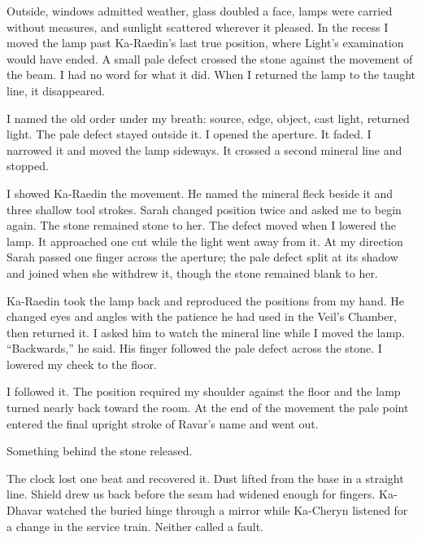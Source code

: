 Outside, windows admitted weather, glass doubled a face, lamps were carried without measures, and sunlight scattered wherever it pleased. In the recess I moved the lamp past Ka-Raedin's last true position, where Light's examination would have ended. A small pale defect crossed the stone against the movement of the beam. I had no word for what it did. When I returned the lamp to the taught line, it disappeared.\par

I named the old order under my breath: source, edge, object, cast light, returned light. The pale defect stayed outside it. I opened the aperture. It faded. I narrowed it and moved the lamp sideways. It crossed a second mineral line and stopped.\par

I showed Ka-Raedin the movement. He named the mineral fleck beside it and three shallow tool strokes. Sarah changed position twice and asked me to begin again. The stone remained stone to her. The defect moved when I lowered the lamp. It approached one cut while the light went away from it. At my direction Sarah passed one finger across the aperture; the pale defect split at its shadow and joined when she withdrew it, though the stone remained blank to her.\par

Ka-Raedin took the lamp back and reproduced the positions from my hand. He changed eyes and angles with the patience he had used in the Veil's Chamber, then returned it. I asked him to watch the mineral line while I moved the lamp. ``Backwards,'' he said. His finger followed the pale defect across the stone. I lowered my cheek to the floor.\par

I followed it. The position required my shoulder against the floor and the lamp turned nearly back toward the room. At the end of the movement the pale point entered the final upright stroke of Ravar's name and went out.\par

Something behind the stone released.\par

The clock lost one beat and recovered it. Dust lifted from the base in a straight line. Shield drew us back before the seam had widened enough for fingers. Ka-Dhavar watched the buried hinge through a mirror while Ka-Cheryn listened for a change in the service train. Neither called a fault.\par

